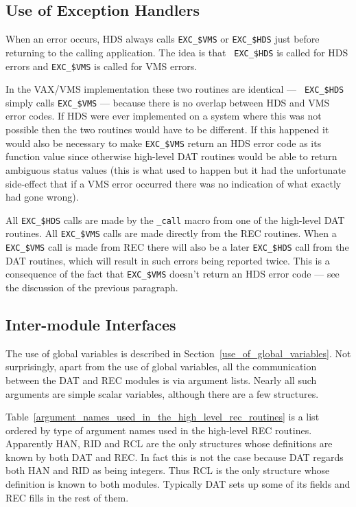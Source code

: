 \subsection {Use of Exception Handlers}

When an error occurs, HDS always calls {\tt EXC\_\$VMS} or {\tt EXC\_\$HDS}
just before returning to the calling application. The idea is that {\tt
EXC\_\$HDS} is called for HDS errors and {\tt EXC\_\$VMS} is called for VMS
errors.

In the VAX/VMS implementation these two routines are identical --- {\tt
EXC\_\$HDS} simply calls {\tt EXC\_\$VMS} --- because there is no overlap
between HDS and VMS error codes. If HDS were ever implemented on a system where
this was not possible then the two routines would have to be different.
If this happened it would also be necessary to make {\tt EXC\_\$VMS} return
an HDS error code as its function value since otherwise high-level DAT routines
would be able to return ambiguous status values (this is what used to happen
but it had the unfortunate side-effect that if a VMS error occurred there
was no indication of what exactly had gone wrong).

All {\tt EXC\_\$HDS} calls are made by the {\tt \_call} macro from one of
the high-level DAT routines. All {\tt EXC\_\$VMS} calls are made directly
from the REC routines. When a {\tt EXC\_\$VMS} call is made from REC there
will also be a later {\tt EXC\_\$HDS} call from the DAT routines, which
will result in such errors being reported twice. This is a consequence of
the fact that {\tt EXC\_\$VMS} doesn't return an HDS error code --- see
the discussion of the previous paragraph.

\subsection {Inter-module Interfaces}

The use of global variables is described in
Section~\ref{use_of_global_variables}. Not surprisingly, apart from the use of
global variables, all the communication between the DAT and REC modules is via
argument lists. Nearly all such arguments are simple scalar variables, although
there are a few structures.

Table~\ref{argument_names_used_in_the_high_level_rec_routines} is a list
ordered by type of argument names used in the high-level REC routines.
Apparently HAN, RID and RCL are the only structures whose definitions are
known by both DAT and REC. In fact this is not the case because DAT regards
both HAN and RID as being integers. Thus RCL is the only structure whose
definition is known to both modules. Typically DAT sets up some of its fields
and REC fills in the rest of them.

